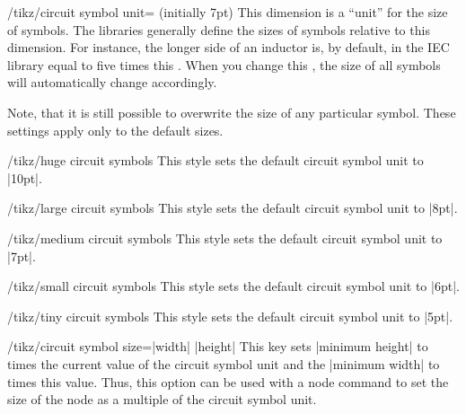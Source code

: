\begin{key}{/tikz/circuit symbol unit= (initially 7pt)}
    This dimension is a ``unit'' for the size of symbols. The libraries
    generally define the sizes of symbols relative to this dimension. For
    instance, the longer side of an inductor is, by default, in the IEC library
    equal to five times this . When you change this
    , the size of all symbols will automatically change
    accordingly.

    Note, that it is still possible to overwrite the size of any particular
    symbol. These settings apply only to the default sizes.
\begin{codeexample}[preamble={\usetikzlibrary{circuits.ee.IEC}}]
\end{codeexample}
\end{key}

\begin{stylekey}{/tikz/huge circuit symbols}
    This style sets the default circuit symbol unit to |10pt|.
\end{stylekey}
%
\begin{stylekey}{/tikz/large circuit symbols}
    This style sets the default circuit symbol unit to |8pt|.
\end{stylekey}
%
\begin{stylekey}{/tikz/medium circuit symbols}
    This style sets the default circuit symbol unit to |7pt|.
\end{stylekey}
%
\begin{stylekey}{/tikz/small circuit symbols}
    This style sets the default circuit symbol unit to |6pt|.
\end{stylekey}
%
\begin{stylekey}{/tikz/tiny circuit symbols}
    This style sets the default circuit symbol unit to |5pt|.
\end{stylekey}

\begin{key}{/tikz/circuit symbol size=|width|  |height| }
    This key sets |minimum height| to  times the current value of
    the circuit symbol unit and the |minimum width| to  times this
    value. Thus, this option can be used with a node command to set the size of
    the node as a multiple of the circuit symbol unit.
\begin{codeexample}[preamble={\usetikzlibrary{circuits.ee.IEC}}]
\end{codeexample}
\end{key}


